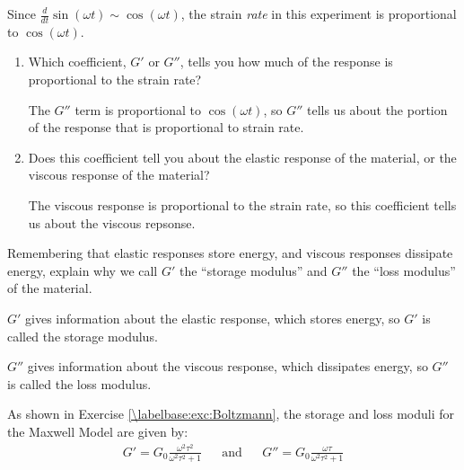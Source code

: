 \begin{activity}
\begin{ctqs}
\begin{enumerate}
			\end{enumerate}
		
		\question Since $\frac{d}{dt}\sin(\omega t) \sim \cos(\omega t)$, the strain \emph{rate} in this experiment is proportional to $\cos(\omega t)$.
		
			\begin{enumerate}
		
				\item Which coefficient, $G'$ or $G''$, tells you how much of the response is proportional to the strain rate?
	
					\begin{solution}[1.1in]
						The $G''$ term is proportional to $\cos(\omega t)$, so $G''$ tells us about the portion of the response that is proportional to strain rate.
					\end{solution}
		
				\item Does this coefficient tell you about the elastic response of the material, or the viscous response of the material?
	
					\begin{solution}[1.1in]
					
						The viscous response is proportional to the strain rate, so this coefficient tells us about the viscous repsonse.
					
					\end{solution}
					
			\end{enumerate}
		
		\question Remembering that elastic responses store energy, and viscous responses dissipate energy, explain why we call $G'$ the ``storage modulus'' and $G''$ the ``loss modulus'' of the material.
	
					\begin{solution}[2in]
					
						$G'$ gives information about the elastic response, which stores energy, so $G'$ is called the storage modulus.
						
						$G''$ gives information about the viscous response, which dissipates energy, so $G''$ is called the loss modulus.
					\end{solution}
			
\end{ctqs}

\clearpage
\begin{model}
\label{\labelbase:mdl:dynamicmoduli}
	As shown in Exercise \ref{\labelbase:exc:Boltzmann}, the storage and loss moduli for the Maxwell Model are given by:
	\begin{align*}
		G' = G_0 \frac{\omega^2 \tau^2}{\omega^2 \tau^2 + 1} && \text{and} && G'' = G_0 \frac{\omega \tau}{\omega^2 \tau^2 + 1}
	\end{align*}
	

\end{model}
\end{activity}
